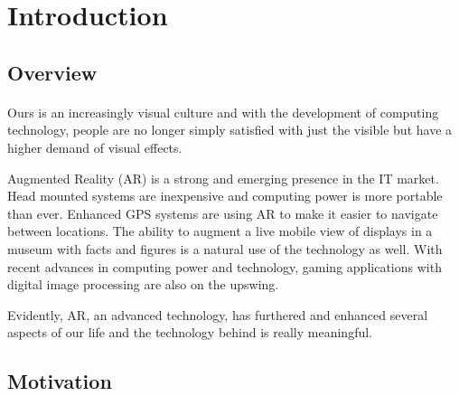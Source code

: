 \section{Introduction}
\label{sec:Introduction}

\subsection{Overview} 
\paragraph{}
Ours is an increasingly visual culture and with the development of computing technology, people are no longer simply satisfied with just the visible but have a higher demand of visual effects.\cite{kenny_2010}
\par Augmented Reality (AR) is a strong and emerging presence in the IT market. Head mounted systems are inexpensive and computing power is more portable than ever. Enhanced GPS systems are using AR to make it easier to navigate between locations. The ability to augment a live mobile view of displays in a museum with facts and figures is a natural use of the technology as well. With recent advances in computing power and technology, gaming applications with digital image processing are also on the upswing. 
\par Evidently, AR, an advanced technology, has furthered and enhanced several aspects of our life and the technology behind is really meaningful.

\subsection{Motivation}
